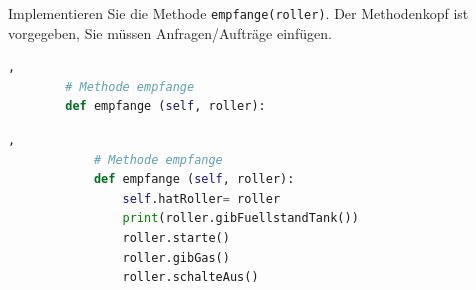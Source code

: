 \documentclass[a4paper]{scrartcl}
\begin{document}
\begin{aufgabe}
    Implementieren Sie die Methode \texttt{empfange(roller)}. Der Methodenkopf ist vorgegeben, Sie müssen Anfragen/Aufträge einfügen.
    \begin{lstlisting}[language=python,gobble=8],
        # Methode empfange
        def empfange (self, roller):

    \end{lstlisting}
    \begin{loesung}
        \begin{lstlisting}[language=python,gobble=12],
            # Methode empfange
            def empfange (self, roller):
                self.hatRoller= roller
                print(roller.gibFuellstandTank())
                roller.starte()
                roller.gibGas()
                roller.schalteAus()
        \end{lstlisting}
    \end{loesung}
\end{aufgabe}
\end{document}
